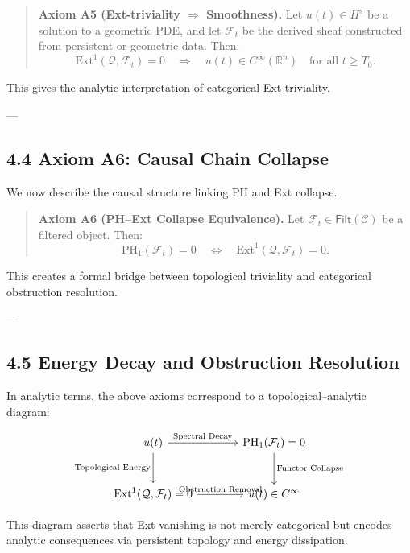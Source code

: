 \documentclass[11pt]{article}
\begin{document}
\begin{quote}
\textbf{Axiom A5 (Ext-triviality $\Rightarrow$ Smoothness).}  
Let \( u(t) \in H^s \) be a solution to a geometric PDE, and let \( \mathcal{F}_t \)  
be the derived sheaf constructed from persistent or geometric data. Then:
\[
\mathrm{Ext}^1(\mathcal{Q}, \mathcal{F}_t) = 0 
\quad \Longrightarrow \quad 
u(t) \in C^\infty(\mathbb{R}^n) \quad \text{for all } t \geq T_0.
\]
\end{quote}

This gives the analytic interpretation of categorical Ext-triviality.

---

\subsection*{4.4 Axiom A6: Causal Chain Collapse}

We now describe the causal structure linking PH and Ext collapse.

\begin{quote}
\textbf{Axiom A6 (PH–Ext Collapse Equivalence).}  
Let \( \mathcal{F}_t \in \mathsf{Filt}(\mathcal{C}) \) be a filtered object. Then:
\[
\mathrm{PH}_1(\mathcal{F}_t) = 0 
\quad \Longleftrightarrow \quad 
\mathrm{Ext}^1(\mathcal{Q}, \mathcal{F}_t) = 0.
\]
\end{quote}

This creates a formal bridge between topological triviality and categorical obstruction resolution.

---

\subsection*{4.5 Energy Decay and Obstruction Resolution}

In analytic terms, the above axioms correspond to a topological–analytic diagram:

\[
\begin{tikzcd}[column sep=large, row sep=large]
u(t) \arrow[r, "\text{Spectral Decay}"] \arrow[d, swap, "\text{Topological Energy}"]
& \mathrm{PH}_1(\mathcal{F}_t) = 0 \arrow[d, "\text{Functor Collapse}"] \\
\mathrm{Ext}^1(\mathcal{Q}, \mathcal{F}_t) = 0 \arrow[r, "\text{Obstruction Removal}"]
& u(t) \in C^\infty
\end{tikzcd}
\]

This diagram asserts that Ext-vanishing is not merely categorical but encodes analytic consequences  
via persistent topology and energy dissipation.
\end{document}
